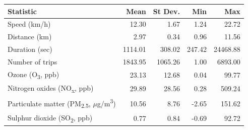 \begin{tabular}{lrrrr}
\toprule
Statistic & Mean & St Dev. & Min & Max \\
\midrule
Speed (km/h) & 12.30 & 1.67 & 1.24 & 22.72 \\
Distance (km) & 2.97 & 0.34 & 0.96 & 11.56 \\
Duration (sec) & 1114.01 & 308.02 & 247.42 & 24468.88 \\
Number of trips & 1843.95 & 1065.26 & 1.00 & 6893.00 \\
Ozone (O\textsubscript{3}, ppb) & 23.13 & 12.68 & 0.04 & 99.77 \\
Nitrogen oxides (NO\textsubscript{x}, ppb) & 29.89 & 28.56 & 0.28 & 509.24 \\
Particulate matter (PM\textsubscript{2.5}, $\mu$g/m\textsuperscript{3}) & 10.56 & 8.76 & -2.65 & 151.62 \\
Sulphur dioxide (SO\textsubscript{2}, ppb) & 0.77 & 0.84 & -0.69 & 92.72 \\
\bottomrule
\end{tabular}

